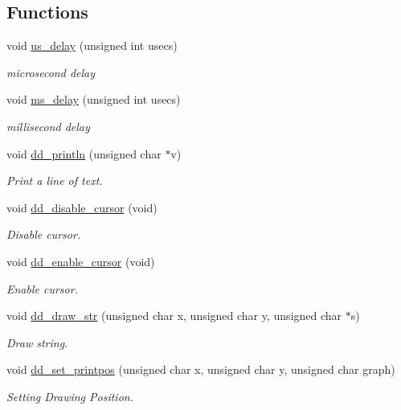 \subsection*{\-Functions}
\begin{DoxyCompactItemize}
\item 
void \hyperlink{group__display_ga07e69aff750648fd47a75afc4da8c0d4}{us\-\_\-delay} (unsigned int usecs)
\begin{DoxyCompactList}\small\item\em microsecond delay \end{DoxyCompactList}\item 
void \hyperlink{group__display_gac8bd0fbcbea79baa54d11e5b5882b7cd}{ms\-\_\-delay} (unsigned int usecs)
\begin{DoxyCompactList}\small\item\em millisecond delay \end{DoxyCompactList}\item 
void \hyperlink{group__display_ga2c63ec2b4e0ad55ca0a8c6d3b59cec29}{dd\-\_\-println} (unsigned char $\ast$v)
\begin{DoxyCompactList}\small\item\em \-Print a line of text. \end{DoxyCompactList}\item 
void \hyperlink{group__display_gaa7cf318c844e09b44ba46b498ee9c61b}{dd\-\_\-disable\-\_\-cursor} (void)
\begin{DoxyCompactList}\small\item\em \-Disable cursor. \end{DoxyCompactList}\item 
void \hyperlink{group__display_gac87dcc801a81225439938546afc3aeca}{dd\-\_\-enable\-\_\-cursor} (void)
\begin{DoxyCompactList}\small\item\em \-Enable cursor. \end{DoxyCompactList}\item 
void \hyperlink{group__display_gadc3cefb31b0c5e2048f33bf0e32af331}{dd\-\_\-draw\-\_\-str} (unsigned char x, unsigned char y, unsigned char $\ast$s)
\begin{DoxyCompactList}\small\item\em \-Draw string. \end{DoxyCompactList}\item 
void \hyperlink{group__display_gad988058b08a1d4853ac978fedf6365f3}{dd\-\_\-set\-\_\-printpos} (unsigned char x, unsigned char y, unsigned char graph)
\begin{DoxyCompactList}\small\item\em \-Setting \-Drawing \-Position. \end{DoxyCompactList}\item 

\end{DoxyCompactItemize}
